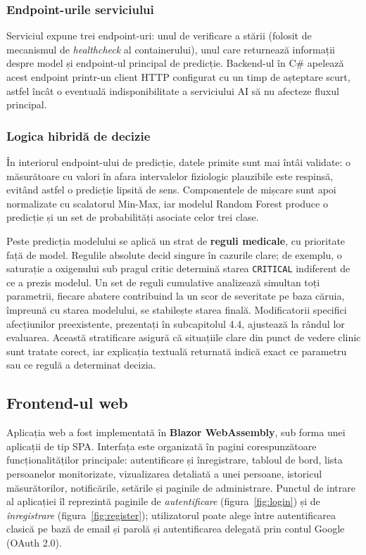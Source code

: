 \documentclass[12pt,a4paper,twoside]{article}
\begin{document}
\subsubsection{Endpoint-urile serviciului}

Serviciul expune trei endpoint-uri: unul de verificare a stării (folosit de mecanismul de \textit{healthcheck} al containerului), unul care returnează informații despre model și endpoint-ul principal de predicție. Backend-ul în C\# apelează acest endpoint printr-un client HTTP configurat cu un timp de așteptare scurt, astfel încât o eventuală indisponibilitate a serviciului AI să nu afecteze fluxul principal.

\subsubsection{Logica hibridă de decizie}

În interiorul endpoint-ului de predicție, datele primite sunt mai întâi validate: o măsurătoare cu valori în afara intervalelor fiziologic plauzibile este respinsă, evitând astfel o predicție lipsită de sens. Componentele de mișcare sunt apoi normalizate cu scalatorul Min-Max, iar modelul Random Forest produce o predicție și un set de probabilități asociate celor trei clase.

Peste predicția modelului se aplică un strat de \textbf{reguli medicale}, cu prioritate față de model. Regulile absolute decid singure în cazurile clare; de exemplu, o saturație a oxigenului sub pragul critic determină starea \texttt{CRITICAL} indiferent de ce a prezis modelul. Un set de reguli cumulative analizează simultan toți parametrii, fiecare abatere contribuind la un scor de severitate pe baza căruia, împreună cu starea modelului, se stabilește starea finală. Modificatorii specifici afecțiunilor preexistente, prezentați în subcapitolul 4.4, ajustează la rândul lor evaluarea. Această stratificare asigură că situațiile clare din punct de vedere clinic sunt tratate corect, iar explicația textuală returnată indică exact ce parametru sau ce regulă a determinat decizia.

\subsection{Frontend-ul web}

Aplicația web a fost implementată în \textbf{Blazor WebAssembly}, sub forma unei aplicații de tip SPA. Interfața este organizată în pagini corespunzătoare funcționalităților principale: autentificare și înregistrare, tabloul de bord, lista persoanelor monitorizate, vizualizarea detaliată a unei persoane, istoricul măsurătorilor, notificările, setările și paginile de administrare. Punctul de intrare al aplicației îl reprezintă paginile de \textit{autentificare} (figura~\ref{fig:login}) și de \textit{înregistrare} (figura~\ref{fig:register}); utilizatorul poate alege între autentificarea clasică pe bază de email și parolă și autentificarea delegată prin contul Google (OAuth 2.0).
\end{document}
